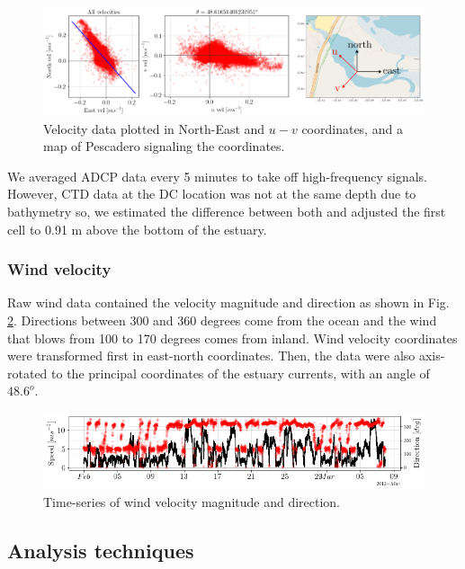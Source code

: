 \documentclass[tesis.tex]{subfiles}
\begin{document}
\begin{figure}[h!]
    \centering
    \includegraphics[width=\textwidth]{Imagenes/rotacion.png}
    \caption{Velocity data plotted in North-East and $u-v$ coordinates, and a map of Pescadero signaling the coordinates.}
    \label{fig:rotacion}
\end{figure}

We averaged ADCP data every 5 minutes to take off high-frequency signals. However, CTD data at the DC location was not at the same depth due to bathymetry so, we estimated the difference between both and adjusted the first cell to 0.91 m above the bottom of the estuary. 

\subsubsection{Wind velocity}

Raw wind data contained the velocity magnitude and direction as shown in Fig. \ref{fig:wind_raw}. Directions between 300 and 360 degrees come from the ocean and the wind that blows from 100 to 170 degrees comes from inland. Wind velocity coordinates were transformed first in east-north coordinates. Then, the data were also axis-rotated to the principal coordinates of the estuary currents, with an angle of $48.6^o$.

\begin{figure}[h!]
    \centering
    \includegraphics[width=\textwidth]{Imagenes/wind_raw.png}
    \caption{Time-series of wind velocity magnitude and direction.}
    \label{fig:wind_raw}
\end{figure}

\subsection{Analysis techniques}
\end{document}
